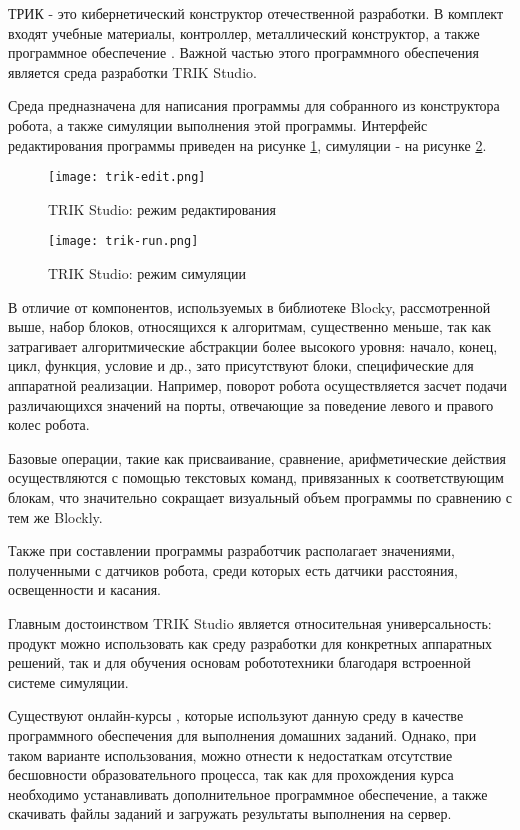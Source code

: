 ТРИК - это кибернетический конструктор отечественной разработки. В комплект входят учебные материалы, контроллер, металлический конструктор, а также программное обеспечение \cite{trik}. Важной частью этого программного обеспечения является среда разработки TRIK Studio. 

Среда предназначена для написания программы для собранного из конструктора робота, а также симуляции выполнения этой программы. Интерфейс редактирования программы приведен на рисунке \ref{fig:trik-edit}, симуляции - на рисунке \ref{fig:trik-run}.

\begin{figure}[htbp]
	\centering
	\texttt{[image: trik-edit.png]}
	\caption{TRIK Studio: режим редактирования}%
	\label{fig:trik-edit}
\end{figure}

\begin{figure}[htbp]
	\centering
	\texttt{[image: trik-run.png]}
	\caption{TRIK Studio: режим симуляции}%
	\label{fig:trik-run}
\end{figure}

В отличие от компонентов, используемых в библиотеке Blocky, рассмотренной выше, набор блоков, относящихся к алгоритмам, существенно меньше, так как затрагивает алгоритмические абстракции более высокого уровня: начало, конец, цикл, функция, условие и др., зато присутствуют блоки, специфические для аппаратной реализации. Например, поворот робота осуществляется засчет подачи различающихся значений на порты, отвечающие за поведение левого и правого колес робота.

Базовые операции, такие как присваивание, сравнение, арифметические действия осуществляются с помощью текстовых команд, привязанных к соответствующим блокам, что значительно сокращает визуальный объем программы по сравнению с тем же Blockly.

Также при составлении программы разработчик располагает значениями, полученными с датчиков робота, среди которых есть датчики расстояния, освещенности и касания.

Главным достоинством TRIK Studio является относительная универсальность: продукт можно использовать как среду разработки для конкретных аппаратных решений, так и для обучения основам робототехники благодаря встроенной системе симуляции.

Существуют онлайн-курсы \cite{stepik}, которые используют данную среду в качестве программного обеспечения для выполнения домашних заданий. Однако, при таком варианте использования, можно отнести к недостаткам отсутствие бесшовности образовательного процесса, так как для прохождения курса необходимо устанавливать дополнительное программное обеспечение, а также скачивать файлы заданий и загружать результаты выполнения на сервер.

